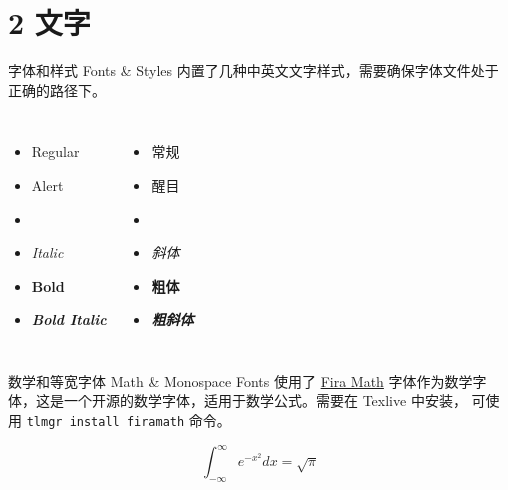 \documentclass[10pt,aspectratio=169,fontset=none]{ctexbeamer}
\begin{document}
    \section{2 文字}

    \begin{frame}{字体和样式 Fonts \& Styles}
        内置了几种中英文文字样式，需要确保字体文件处于正确的路径下。
        \begin{columns}
            \begin{itemize}
                \item Regular
                \item \alert{Alert}
                \item {}
                \item \textit{Italic}
                \item \textbf{Bold}
                \item \textbf{\textit{Bold Italic}}
            \end{itemize}
            \begin{itemize}
                \item 常规
                \item \alert{醒目}
                \item {}
                \item \textit{斜体}
                \item \textbf{粗体}
                \item \textbf{\textit{粗斜体}}
            \end{itemize}
        \end{columns}
        
    \end{frame}

    \begin{frame}{数学和等宽字体 Math \& Monospace Fonts}
        使用了 \href{https://github.com/firamath/firamath}{Fira Math} 字体作为数学字体，这是一个开源的数学字体，适用于数学公式。需要在 Texlive 中安装， 可使用 \texttt{\alert{tlmgr} install firamath} 命令。

        \begin{equation}
            \int_{-\infty}^{\infty} e^{-x^2} dx = \sqrt{\pi}
        \end{equation}
    \end{frame}
\end{document}
